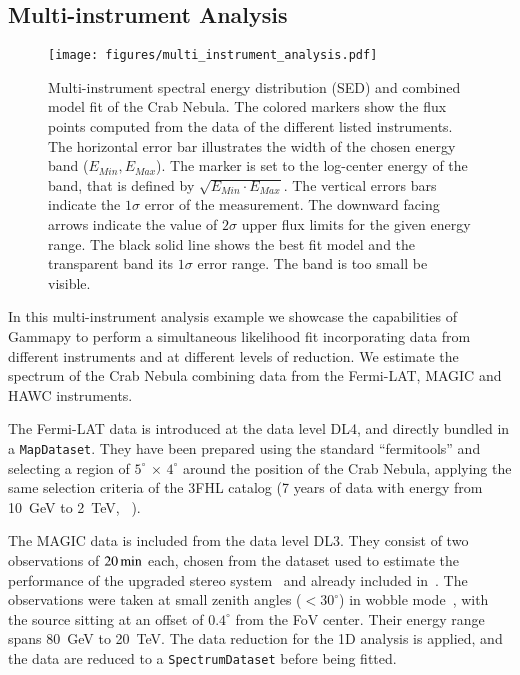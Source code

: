 \documentclass[longauth]{aa}
\newcommand{\code}[1]{\texttt{#1}}
\newcommand{\gammapy}{Gammapy\xspace}
\newcommand{\hawc}{HAWC\xspace}
\newcommand{\magic}{MAGIC\xspace}
\newcommand{\fermi}{Fermi-LAT\xspace}
\begin{document}
\subsection{Multi-instrument Analysis}
\label{ssec:multi-instrument-analysis}
%
\begin{figure*}[t]
        \sidecaption
        \texttt{[image: figures/multi\_instrument\_analysis.pdf]}
        \caption{
        Multi-instrument spectral energy distribution (SED) and combined model fit
        of the Crab Nebula. The  colored markers show the flux points computed from
        the data of the different listed instruments. The horizontal error bar
        illustrates the width of the chosen energy band ($E_{Min}, E_{Max}$).
        The marker is set to the log-center energy of the band, that is
        defined by $\sqrt{E_{Min} \cdot E_{Max}}$. The vertical errors bars
        indicate the $1\sigma$ error of the measurement. The downward
        facing arrows indicate the value of $2\sigma$ upper flux limits
        for the given energy range. The black solid line shows the best
        fit model and the transparent band its $1\sigma$ error range.
                The band is too small be visible.
    }
        \label{fig:multi_instrument_analysis}
\end{figure*}
%
In this multi-instrument analysis example we showcase the capabilities of
\gammapy to perform a simultaneous likelihood fit incorporating data from
different instruments and at different levels of reduction. We estimate the
spectrum of the Crab Nebula combining data from the \fermi, \magic and \hawc
instruments.

The \fermi data is introduced at the data level DL4, and directly bundled in a
\code{MapDataset}. They have been prepared using the standard \enquote{fermitools} \citep{Fermitools2019} and
selecting a region of $5^{\circ}\,\times\,4^{\circ}$ around the
position of the Crab Nebula, applying the same selection criteria of the 3FHL
catalog (7 years of data with energy from \SI{10}{GeV} to \SI{2}{TeV},
~\citealt{3FHL}).

The \magic data is included from the data level DL3. They consist of two
observations of $20\,{\rm min}$ each, chosen from the dataset used to estimate
the performance of the upgraded stereo system~\citep{magic_performance} and
already included in~\cite{joint_crab}. The observations were taken at small
zenith angles ($<30^{\circ}$) in wobble mode~\citep{fomin_1994}, with the
source sitting at an offset of $0.4^{\circ}$ from the FoV center. Their energy
range spans \SI{80}{GeV} to \SI{20}{TeV}. The data reduction for the 1D analysis
is applied, and the data are reduced to a \code{SpectrumDataset} before being fitted.
\end{document}
